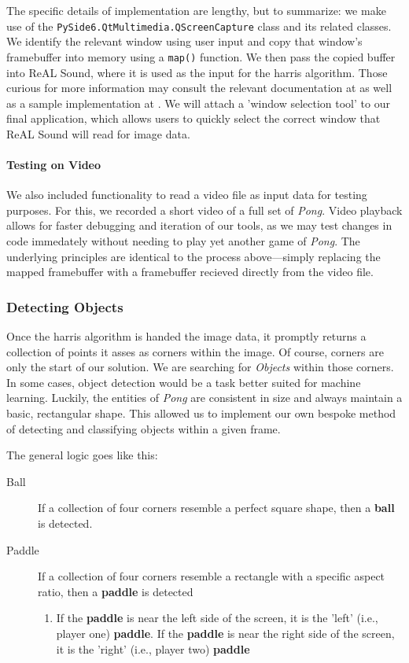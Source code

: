 \documentclass{report}
\newcommand{\rs}{ReAL Sound\xspace}
\newcommand{\pad}{\textbf{paddle}\xspace}
\newcommand{\ball}{\textbf{ball}\xspace}
\begin{document}
The specific details of implementation are lengthy, but to summarize: we make use of the \texttt{PySide6.QtMultimedia.QScreenCapture} class and its related classes. We identify the relevant window using user input and copy that window's framebuffer into memory using a \texttt{map()} function. We then pass the copied buffer into \rs, where it is used as the input for the harris algorithm.  Those curious for more information may consult the relevant documentation at \cite{QT_Doc} as well as a sample implementation at \cite{QT_EX}. We will attach a 'window selection tool' to our final application, which allows users to quickly select the correct window that \rs will read for image data. 

\paragraph{Testing on Video} 
We also included functionality to read a video file as input data for testing purposes. For this, we recorded a short video of a full set of \emph{Pong}. Video playback allows for faster debugging and iteration of our tools, as we may test changes in code immedately without needing to play yet another game of \emph{Pong}. The underlying principles are identical to the process above---simply replacing the mapped framebuffer with a framebuffer recieved directly from the video file.

\subsubsection{Detecting Objects}
Once the harris algorithm is handed the image data, it promptly returns a collection of points it asses as corners within the image. Of course, corners are only the start of our solution. We are searching for \emph{Objects} within those corners. In some cases, object detection would be a task better suited for machine learning. Luckily, the entities of \emph{Pong} are consistent in size and always maintain a basic, rectangular shape. This allowed us to implement our own bespoke method of detecting and classifying objects within a given frame.

The general logic goes like this:

\begin{description}
    \item[Ball] If a collection of four corners resemble a perfect square shape, then a \ball is detected.  
    \item[Paddle] If a collection of four corners resemble a rectangle with a specific aspect ratio, then a \pad is detected
        \begin{enumerate}
            \item If the \pad is near the left side of the screen, it is the 'left' (i.e., player one) \pad. If the \pad is near the right side of the screen, it is the 'right' (i.e., player two) \pad
        \end{enumerate}
\end{description}
\end{document}
